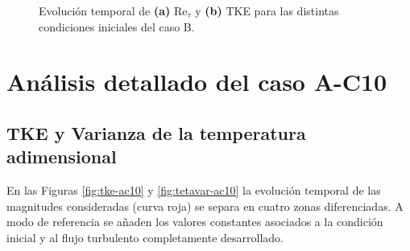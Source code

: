 \begin{figure}[H]
  \centering  

  \caption{Evolución temporal de \textbf{(a)} Re$_{\tau}$ y \textbf{(b)} TKE para las distintas condiciones iniciales del caso B.}
  \label{fig:case-B-Re5000-Pr071}
\end{figure}


\section{Análisis detallado del caso A-C10} \label{sec:ac10}

\subsection{TKE y Varianza de la temperatura adimensional}

En las Figuras \ref{fig:tke-ac10} y \ref{fig:tetavar-ac10} la evolución temporal de las magnitudes consideradas (curva roja) se separa en cuatro zonas diferenciadas. A modo de referencia se añaden los valores constantes asociados a la condición inicial y al flujo turbulento completamente desarrollado.

